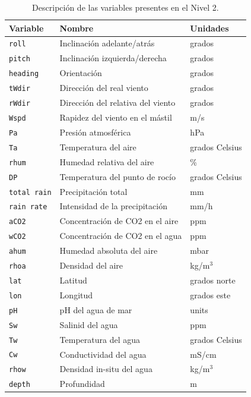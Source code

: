 \documentclass[11pt]{article}
\begin{document}
\begin{table}[htpb]
  \scriptsize
  \centering
  \caption{Descripción de las variables presentes en el Nivel 2.}
  \label{tab:variables_nivel2}
  \begin{tabular}{l l l}
    \toprule
    Variable & Nombre & Unidades \\
    \midrule
    \texttt{roll} & Inclinación adelante/atrás & grados \\
    \texttt{pitch} & Inclinación izquierda/derecha & grados \\
    \texttt{heading} & Orientación & grados \\
    \texttt{tWdir} & Dirección del real viento & grados \\
    \texttt{rWdir} & Dirección del relativa del viento & grados \\
    \texttt{Wspd} & Rapidez del viento en el mástil & m/s \\
    \texttt{Pa} & Presión atmosférica & hPa \\
    \texttt{Ta} & Temperatura del aire & grados Celsius \\
    \texttt{rhum} & Humedad relativa del aire & \% \\
    \texttt{DP} & Temperatura del punto de rocío & grados Celsius \\
    \texttt{total rain} & Precipitación total & mm \\
    \texttt{rain rate} & Intensidad de la precipitación & mm/h \\
    \texttt{aCO2} & Concentración de CO2 en el aire & ppm \\
    \texttt{wCO2} & Concentración de CO2 en el agua & ppm \\
    \texttt{ahum} & Humedad absoluta del aire & mbar \\
    \texttt{rhoa} & Densidad del aire & kg/m$^3$ \\
    \texttt{lat} & Latitud & grados norte \\
    \texttt{lon} & Longitud & grados este \\
    \texttt{pH} & pH del agua de mar & units \\
    \texttt{Sw} & Salinid del agua & ppm \\
    \texttt{Tw} & Temperatura del agua & grados Celsius \\
    \texttt{Cw} & Conductividad del agua & mS/cm \\
    \texttt{rhow} & Densidad in-situ del agua & kg/m$^3$ \\
    \texttt{depth} & Profundidad & m \\

\end{tabular}
\end{table}
\end{document}
